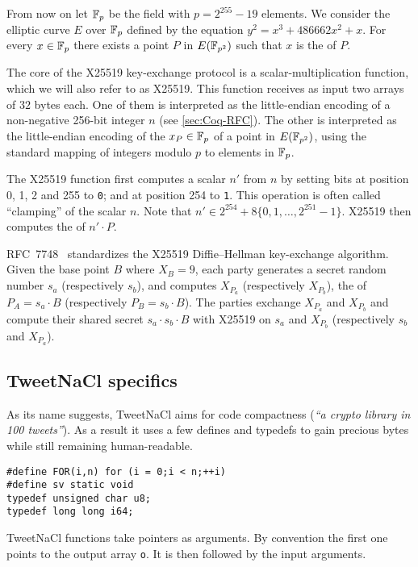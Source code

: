 From now on let $\mathbb{F}_{p}$ be the field with $p=2^{255}-19$ elements.
We consider the elliptic curve $E$ over $\mathbb{F}_{p}$ defined by the
equation $y^2 = x^3 + 486662 x^2 + x$.
For every $x \in \mathbb{F}_{p}$ there exists a point $P$ in $E(\mathbb{F}_{p^2})$
such that $x$ is the \xcoord of $P$.

The core of the X25519 key-exchange protocol is a scalar\hyp{}multiplication
function, which we will also refer to as X25519.
This function receives as input two arrays of $32$ bytes each.
One of them is interpreted as the little-endian encoding of a
non-negative 256-bit integer $n$ (see \ref{sec:Coq-RFC}).
The other is interpreted as the little-endian encoding of
the \xcoord $x_P \in \mathbb{F}_{p}$ of a point in $E(\mathbb{F}_{p^2})$,
using the standard mapping of integers modulo $p$ to elements in $\mathbb{F}_{p}$.

The X25519 function first computes a scalar $n'$ from $n$ by setting
bits at position 0, 1, 2 and 255 to \texttt{0}; and at position 254
to \texttt{1}.
This operation is often called ``clamping'' of the scalar $n$.
Note that $n' \in 2^{254} + 8\{0,1,\ldots,2^{251}-1\}$.
X25519 then computes the \xcoord of $n'\cdot P$.

RFC~7748~\cite{rfc7748} standardizes the X25519 Diffie–Hellman key-exchange algorithm.
Given the base point $B$ where $X_B=9$, each party generates a secret random number
$s_a$ (respectively $s_b$), and computes $X_{P_a}$ (respectively $X_{P_b}$), the
\xcoord of $P_A = s_a \cdot B$ (respectively $P_B = s_b \cdot B$).
The parties exchange $X_{P_a}$ and $X_{P_b}$ and compute their shared secret
$s_a \cdot  s_b \cdot B$ with
X25519 on $s_a$ and $X_{P_b}$ (respectively $s_b$ and $X_{P_a}$).


\subsection{TweetNaCl specifics}
\label{subsec:Number-TweetNaCl}

As its name suggests, TweetNaCl aims for code compactness (\emph{``a crypto library in 100 tweets''}).
As a result it uses a few defines and typedefs to gain precious bytes while
still remaining human-readable.
\begin{lstlisting}[language=Ctweetnacl,stepnumber=0]
#define FOR(i,n) for (i = 0;i < n;++i)
#define sv static void
typedef unsigned char u8;
typedef long long i64;
\end{lstlisting}

TweetNaCl functions take pointers as arguments. By convention the first one
points to the output array \texttt{o}. It is then followed by the input arguments.

